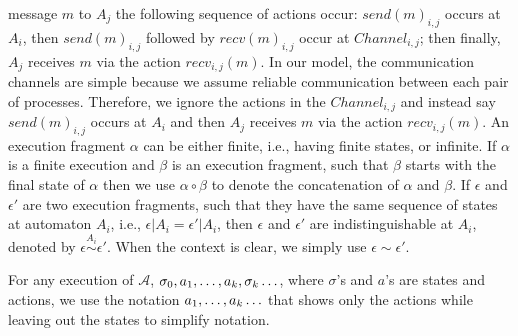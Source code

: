 	message $m$ to $A_j$ the following sequence of actions occur: $send(m)_{i,j}$  occurs at $A_i$, then 
	$send(m)_{i,j}$ followed by $recv(m)_{i, j}$ occur at $Channel_{i,j}$; then finally, $A_j$ receives $m$ via the action $recv_{i,j}(m)$.
	In our model,  the communication channels are simple because we assume reliable communication between each pair of processes. Therefore, we ignore the actions in the $Channel_{i, j}$ and instead say   $send(m)_{i,j}$  occurs at $A_i$ and then $A_j$ receives $m$ via the action $recv_{i,j}(m)$.
	An execution fragment $\alpha$ %
	can be either finite, i.e., having finite states, or infinite.
	If $\alpha$ is a finite execution and $\beta$ is an execution fragment, such that $\beta$ starts with the final state of $\alpha$ then we use $\alpha \circ \beta$ to denote the concatenation of $\alpha$ and $\beta$.
	If $\epsilon$ and $\epsilon'$ are two execution fragments, such that they have the same sequence of states at automaton $A_i$, i.e., $\epsilon|A_i = \epsilon'|A_i$, then $\epsilon$ and $\epsilon'$ are indistinguishable at $A_i$, denoted by $\epsilon \stackrel{A_i}{\sim} \epsilon'$. When the context is clear, we simply use $\epsilon \sim \epsilon'$. 


For any execution of $\mathcal{A}$, 
$\finiteprefix{k-1}{k}\ldots$, where $\sigma$'s and $a$'s are states and actions,
we use the notation $\finiteprefixt{k-1}{k}\ldots$ that shows only the actions while leaving out the states to simplify notation. 




